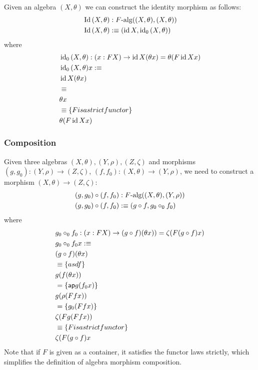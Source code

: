 \documentclass[a4paper,10pt]{article}
\begin{document}
Given an algebra $(X,\theta)$ we can construct the identity morphism as follows:
%
\begin{align*}
  &\operatorname*{Id}{(X,\theta)} : F\mbox{-alg}((X,\theta),(X,\theta)) \\
  &\operatorname*{Id}{(X,\theta)} :\equiv (\operatorname*{id}{X} , \operatorname*{id_0}{(X,\theta)})
\end{align*}
%
where
%
\begin{align*}
  &\operatorname*{id_0}{(X,\theta)} : (x : FX) \to \operatorname*{id}{X} (\theta x) = \theta (F \operatorname*{id}{X} x) \\
  &\operatorname*{id_0}{(X,\theta)} x :\equiv \\
  &\operatorname*{id}{X} (\theta x) \\
  &\equiv \\
  &\theta x \\
  &\equiv \{ F is a strict functor \} \\
  &\theta (F \operatorname*{id}{X} x)
\end{align*}
%
\subsubsection{Composition}

Given three algebras $(X,\theta), (Y,\rho), (Z,\zeta)$ and morphisms
$(g,g_0) : (Y,\rho) \to (Z,\zeta)$,
$(f,f_0) : (X,\theta) \to (Y,\rho)$, we need to construct a morphism
$(X,\theta) \to (Z,\zeta)$:
%
\begin{align*}
  &(g,g_0) \circ (f,f_0) : F\mbox{-alg}((X,\theta),(Y,\rho)) \\
  &(g,g_0) \circ (f,f_0) :\equiv (g \circ f , g_0 \circ_0 f_0)
\end{align*}
%
where
%
\begin{align*}
  &g_0 \circ_0 f_0 : (x : FX) \to (g \circ f) (\theta x)) = \zeta (F (g \circ f) x) \\
  &g_0 \circ_0 f_0 x :\equiv \\
  &(g \circ f) (\theta x) \\
  &\equiv \{ asdf \} \\
  &g (f (\theta x)) \\
  &= \{ \mathsf{ap} g (f_0 x) \} \\
  &g (\rho (F f x)) \\
  &= \{ g_0 (F f x) \} \\
  &\zeta (F g (F f x)) \\
  &\equiv \{ F is a strict functor \} \\
  &\zeta (F (g \circ f) x
\end{align*}
%
Note that if $F$ is given as a container, it satisfies the functor
laws strictly, which simplifies the definition of algebra morphism
composition.
\end{document}
